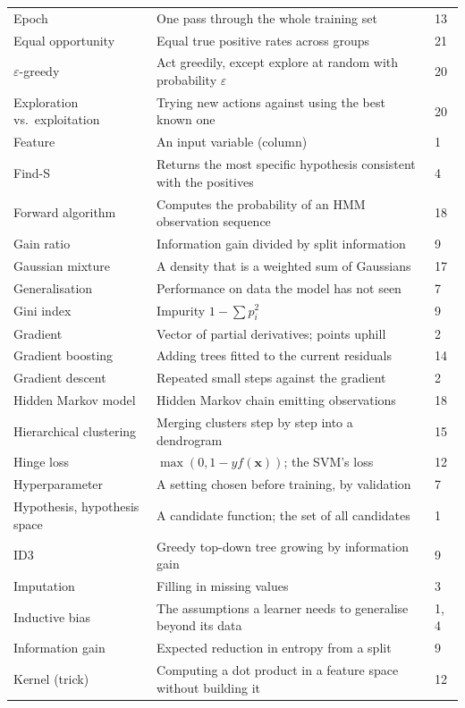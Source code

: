 \begin{longtable}{@{}L{3.9cm}L{9.9cm}L{1.1cm}@{}}
Epoch & One pass through the whole training set & 13 \\
Equal opportunity & Equal true positive rates across groups & 21 \\
$\varepsilon$-greedy & Act greedily, except explore at random with probability $\varepsilon$ & 20 \\
Exploration vs.\ exploitation & Trying new actions against using the best known one & 20 \\
Feature & An input variable (column) & 1 \\
Find-S & Returns the most specific hypothesis consistent with the positives & 4 \\
Forward algorithm & Computes the probability of an HMM observation sequence & 18 \\
Gain ratio & Information gain divided by split information & 9 \\
Gaussian mixture & A density that is a weighted sum of Gaussians & 17 \\
Generalisation & Performance on data the model has not seen & 7 \\
Gini index & Impurity $1 - \sum p_i^2$ & 9 \\
Gradient & Vector of partial derivatives; points uphill & 2 \\
Gradient boosting & Adding trees fitted to the current residuals & 14 \\
Gradient descent & Repeated small steps against the gradient & 2 \\
Hidden Markov model & Hidden Markov chain emitting observations & 18 \\
Hierarchical clustering & Merging clusters step by step into a dendrogram & 15 \\
Hinge loss & $\max(0, 1 - yf(\mathbf{x}))$; the SVM's loss & 12 \\
Hyperparameter & A setting chosen before training, by validation & 7 \\
Hypothesis, hypothesis space & A candidate function; the set of all candidates & 1 \\
ID3 & Greedy top-down tree growing by information gain & 9 \\
Imputation & Filling in missing values & 3 \\
Inductive bias & The assumptions a learner needs to generalise beyond its data & 1, 4 \\
Information gain & Expected reduction in entropy from a split & 9 \\
Kernel (trick) & Computing a dot product in a feature space without building it & 12 \\

\end{longtable}
